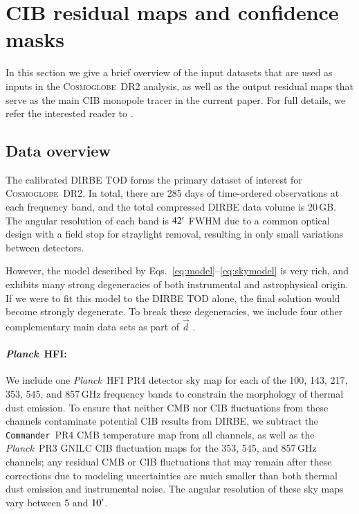 \documentclass{aa}
\def\commander{\texttt{Commander}}
\def\Planck{\textit{Planck}}
\newcommand{\dv}[0]{\vec{d}}
\newcommand{\cosmoglobe}{\textsc{Cosmoglobe}}
\begin{document}
\section{CIB residual maps and confidence masks}
\label{sec:data}

In this section we give a brief overview of the input datasets that
are used as inputs in the \cosmoglobe\ DR2 analysis, as well as the
output residual maps that serve as the main CIB monopole tracer in the
current paper. For full details, we refer the interested reader to
\citet{CG02_01}. 

\subsection{Data overview}
\label{sec:datasummary}

The calibrated DIRBE TOD forms the primary dataset of interest for
\cosmoglobe\ DR2. In total, there are 285 days of time-ordered
observations at each frequency band, and the total compressed DIRBE
data volume is 20\,GB. The angular resolution of each band is
$42\arcm$ FWHM due to a common optical design with a field stop for straylight removal, resulting in  only small variations between detectors.

However, the model described by
Eqs.~\eqref{eq:model}--\eqref{eq:skymodel} is very rich, and exhibits
many strong degeneracies of both instrumental and astrophysical
origin. If we were to fit this model to the DIRBE TOD alone, the final
solution would become strongly degenerate. To break these
degeneracies, we include four other complementary main data sets as
part of $\dv$ \citep{CG02_01}.


\paragraph{\Planck\ HFI:} We include one \Planck\ HFI PR4 \citep{npipe} detector sky map for each of the 100, 143, 217,
  353, 545, and 857\,GHz frequency bands to constrain the morphology
  of thermal dust emission. To ensure that neither CMB nor CIB
  fluctuations from these channels contaminate potential CIB results
  from DIRBE, we subtract the \commander\ PR4 CMB temperature map
  from all channels, as well as the \Planck\ PR3 GNILC
  CIB fluctuation maps \citep{gnilc_cib} for the 353, 545, and 857\,GHz channels; any
  residual CMB or CIB fluctuations that may remain after these
  corrections due to modeling uncertainties are much smaller than
  both thermal dust emission and instrumental noise. The angular
  resolution of these sky maps vary between 5 and $10\arcm$.
\end{document}
